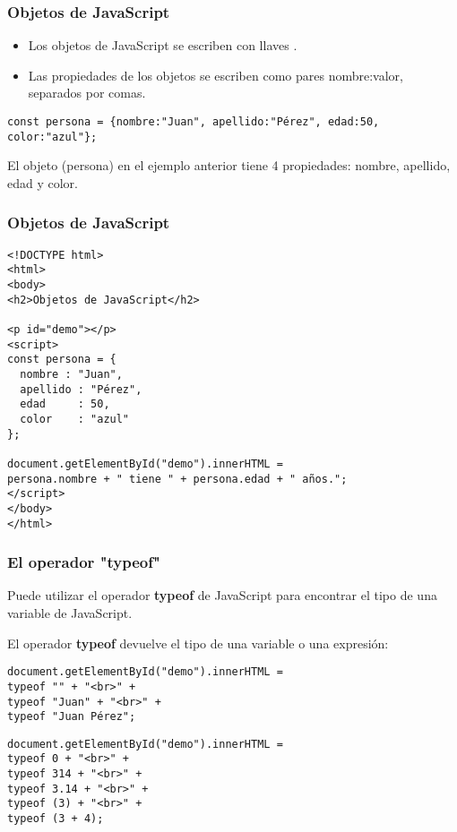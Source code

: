 \begin{frame}[fragile]
  \frametitle{Objetos de JavaScript}

  \begin{itemize}
    \item Los objetos de JavaScript se escriben con llaves {}.
    \item Las propiedades de los objetos se escriben como pares
          nombre:valor, separados por comas.
  \end{itemize}

  \vspace{\baselineskip}
  \begin{lstlisting}
const persona = {nombre:"Juan", apellido:"Pérez", edad:50, color:"azul"};
  \end{lstlisting}

  El objeto (persona) en el ejemplo anterior tiene 4 propiedades:
  nombre, apellido, edad y color.
\end{frame}

\begin{frame}[fragile]
  \frametitle{Objetos de JavaScript}
  \begin{lstlisting}
<!DOCTYPE html>
<html>
<body>
<h2>Objetos de JavaScript</h2>

<p id="demo"></p>
<script>
const persona = {
  nombre : "Juan",
  apellido : "Pérez",
  edad     : 50,
  color    : "azul"
};

document.getElementById("demo").innerHTML =
persona.nombre + " tiene " + persona.edad + " años.";
</script>
</body>
</html>
  \end{lstlisting}
\end{frame}

\begin{frame}[fragile]
  \frametitle{El operador "typeof"}

  Puede utilizar el operador \textbf{typeof} de JavaScript para
  encontrar el tipo de una variable de JavaScript.

  El operador \textbf{typeof} devuelve el tipo de una variable o
  una expresión:

  \vspace{\baselineskip}
  \begin{lstlisting}
document.getElementById("demo").innerHTML = 
typeof "" + "<br>" +
typeof "Juan" + "<br>" + 
typeof "Juan Pérez";
  \end{lstlisting}

  \vspace{\baselineskip}
  \begin{lstlisting}
document.getElementById("demo").innerHTML = 
typeof 0 + "<br>" + 
typeof 314 + "<br>" +
typeof 3.14 + "<br>" +
typeof (3) + "<br>" +
typeof (3 + 4);
  \end{lstlisting}
\end{frame}

